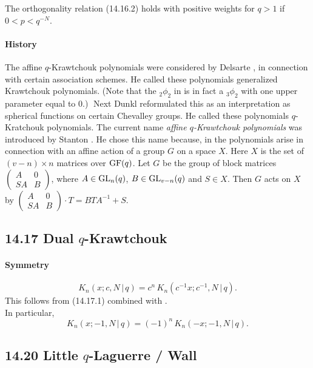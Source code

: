 \documentclass[twoside,11pt]{article}
\newcommand\sa{\smallskipamount}
\newcommand\sLP{\\[\sa]}
\begin{document}
The orthogonality relation (14.16.2) holds with positive weights for $q>1$
if $0<p<q^{-N}$.
%
\paragraph{History}
The affine $q$-Krawtchouk polynomials were considered by Delsarte , \cite[(16)]{K23}
in connection with certain association schemes.
He called these polynomials generalized Krawtchouk polynomials.
(Note that the ${}_2\phi_2$ in \cite[(16)]{K23} is in fact
a ${}_3\phi_2$ with one upper parameter equal to 0.)$\;$
Next Dunkl 
reformulated this as an interpretation as spherical functions
on certain Chevalley groups. He called these polynomials
$q$-Kratchouk polynomials. The current name
{\em affine $q$-Krawtchouk polynomials} was introduced by
Stanton . He chose this name because,
in  the polynomials arise in connection
with an affine action of a group $G$ on a space $X$. Here
$X$ is the set of $(v-n)\times n$ matrices over ${\rm GF}(q)$.
Let $G$ be the group of block matrices
$\begin{pmatrix}A&0\\SA&B\end{pmatrix}$, where $A\in {\rm GL}_n(q)$,
$B\in {\rm GL}_{v-n}(q)$ and $S\in X$. Then $G$ acts on $X$ by
$\begin{pmatrix}A&0\\SA&B\end{pmatrix}\cdot T=BTA^{-1}+S$.
%
\subsection*{14.17 Dual $q$-Krawtchouk}
\label{sec14.17}
%
\paragraph{Symmetry}
\begin{equation}
K_n(x;c,N\,|\, q)=c^n\,K_n(c^{-1}x;c^{-1},N\,|\, q).
\label{87}
\end{equation}
This follows from (14.17.1) combined with .
\sLP
In particular,
\begin{equation}
K_n(x;-1,N\,|\, q)=(-1)^n\,K_n(-x;-1,N\,|\, q).
\label{88}
\end{equation}
%
\subsection*{14.20 Little $q$-Laguerre / Wall}
\label{sec14.20}
%
\end{document}

